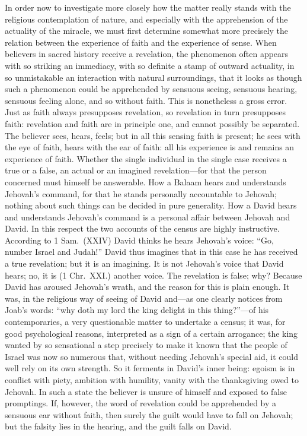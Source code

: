 \documentclass[12pt]{book}
\newcommand{\opage}[1]{\marginnote{\footnotesize\textit{[#1]}}}
\begin{document}
In order now to investigate more closely how the matter really stands
with the religious contemplation of nature, and especially with the
apprehension of the actuality of the miracle, we must first determine
somewhat more precisely the relation between the experience of faith and
the experience of sense. When believers in sacred history receive a
revelation, the phenomenon often appears with so striking an
immediacy, with so definite a stamp of outward actuality, in so
unmistakable an interaction with natural surroundings, that it looks as
though such a phenomenon could be apprehended by sensuous seeing,
sensuous hearing, sensuous feeling alone, and so without faith. This is
nonetheless a gross error. Just as faith always presupposes revelation,
so revelation in turn presupposes faith: revelation and faith are in
principle one, and cannot possibly be separated. The believer sees,
hears, feels; but in all this sensing faith is present; he sees with the
eye of faith, hears with the ear of faith: all his experience is and
remains an experience of faith. Whether the single individual in the
single case receives a true or a false, an actual or an imagined
revelation---for that the person concerned must himself be answerable.
How a Balaam hears and understands Jehovah's command, for that he stands
personally accountable to Jehovah; nothing about such things can be
decided in pure generality. How a David hears and understands Jehovah's
command is a personal affair between Jehovah and David. In this respect
the two accounts of the census are highly instructive. According to
1 Sam.\ (XXIV) David thinks he hears Jehovah's voice: ``Go, number
Israel and Judah!'' David thus imagines that in this case he has
received a true revelation; but it is an imagining. It is not Jehovah's
voice
\opage{171}\setcounter{footnote}{0}%
that David hears; no, it is (1 Chr.\ XXI.) another voice. The revelation
is false; why? Because David has aroused Jehovah's wrath, and the reason
for this is plain enough. It was, in the religious way of seeing of
David and---as one clearly notices from Joab's words: ``why doth my
lord the king delight in this thing?''---of his contemporaries, a very
questionable matter to undertake a census; it was, for good
psychological reasons, interpreted as a sign of a certain arrogance;
the king wanted by so sensational a step precisely to make it known
that the people of Israel was now so numerous that, without needing
Jehovah's special aid, it could well rely on its own strength. So it
ferments in David's inner being: egoism is in conflict with piety,
ambition with humility, vanity with the thanksgiving owed to Jehovah. In
such a state the believer is unsure of himself and exposed to false
promptings. If, however, the word of revelation could be apprehended by
a sensuous ear without faith, then surely the guilt would have to fall
on Jehovah; but the falsity lies in the hearing, and the guilt falls on
David.
\end{document}
